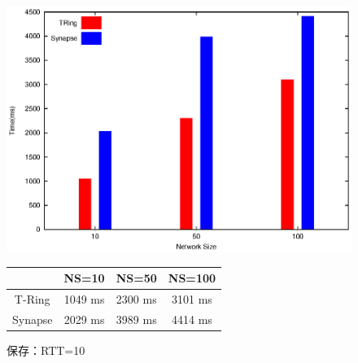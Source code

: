 \begin{figure}[htbp]
\begin{minipage}{1\textwidth}
    \centering
\includegraphics[width=14cm]{./images/compare_store_rtt10.eps}
 \begin{center}
  \begin{tabular}{|c||c|c|c|} \hline
    \backslashbox{}{} & NS=10 & NS=50 & NS=100  \\ \hline \hline
       T-Ring & 1049 ms & 2300 ms & 3101 ms  \\ \hline
       Synapse & 2029  ms & 3989 ms & 4414 ms \\ \hline  \end{tabular}
  \label{tab:RTT=10}
\end{center}
\caption{保存：RTT=10}
 \label{fig:compare_store_rtt10}
 \end{minipage}
\end{figure}

